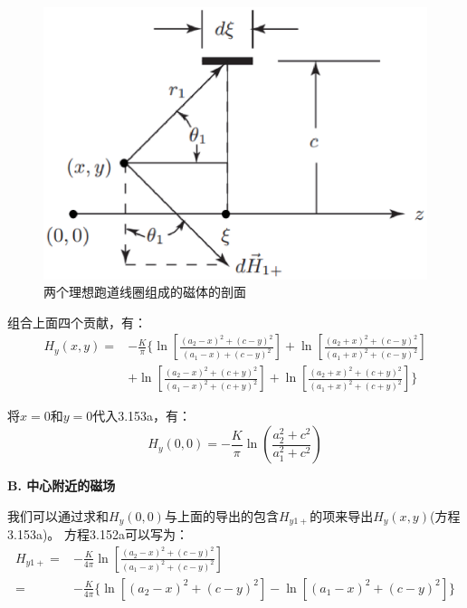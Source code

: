 \begin{figure}[htbp]
	\centering
	\includegraphics[scale=0.5]{chpt3/figs/fig3.37.eps}
	\caption{两个理想跑道线圈组成的磁体的剖面
	}
\end{figure}

组合上面四个贡献，有：
\begin{equation}
\begin{split}
H_{y}(x,y)=&-\frac{K}{\pi}\bigg\{\ln\left[\frac{(a_{2}-x)^{2}+(c-y)^{2}}{(a_{1}-x)+(c-y)^{2}}\right]+\ln\left[\frac{(a_{2}+x)^{2}+(c-y)^{2}}{(a_{1}+x)^{2}+(c-y)^{2}}\right]\\
&+\ln\left[\frac{(a_{2}-x)^{2}+(c+y)^{2}}{(a_{1}-x)^{2}+(c+y)^{2}}\right]+\ln\left[\frac{(a_{2}+x)^{2}+(c+y)^{2}}{(a_{1}+x)^{2}+(c+y)^{2}}\right]\bigg\}
\end{split}
\end{equation}


将$x=0$和$y=0$代入3.153a，有：
\begin{equation}
H_{y}(0,0)=-\frac{K}{\pi}\ln\left(\frac{a_{2}^{2}+c^{2}}{a_{1}^{2}+c^{2}}\right)%
\end{equation}

\textbf{B. 中心附近的磁场}

我们可以通过求和$H_y(0,0)$与上面的导出的包含$H_{y1+}$的项来导出$H_y(x,y)$(方程3.153a)。
方程3.152a可以写为：
\begin{equation}
\begin{split}
H_{y1+}=&-\frac{K}{4\pi}\ln[\frac{(a_{2}-x)^{2}+(c-y)^{2}}{(a_{1}-x)^{2}+(c-y)^{2}}]\\
=&-\frac{K}{4\pi}\{\ln[(a_{2}-x)^{2}+(c-y)^{2}]-\ln[(a_{1}-x)^{2}+(c-y)^{2}]\}%
\end{split}
\end{equation}

